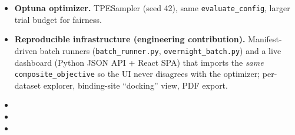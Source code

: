 \begin{itemize}
  \item \textbf{Optuna optimizer.} TPESampler (seed 42), same \texttt{evaluate\_config}, larger trial budget for fairness.
  \item \textbf{Reproducible infrastructure (engineering contribution).} Manifest-driven batch runners (\texttt{batch\_runner.py}, \texttt{overnight\_batch.py}) and a live dashboard (Python JSON API + React SPA) that imports the \emph{same} \texttt{composite\_objective} so the UI never disagrees with the optimizer; per-dataset explorer, binding-site ``docking'' view, PDF export.
  \item {}
  \item {}
  \item {}
\end{itemize}




